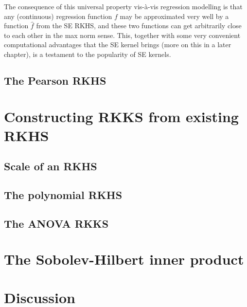 \documentclass[a4paper,showframe,11pt,draft]{report}
\begin{document}
The consequence of this universal property vis-à-vis regression modelling is that any (continuous) regression function $f$ may be approximated very well by a function $\hat f$ from the SE RKHS, and these two functions can get arbitrarily close to each other in the max norm sense.
This, together with some very convenient computational advantages that the SE kernel brings (more on this in a later chapter), is a testament to the popularity of SE kernels.

\subsection{The Pearson RKHS}

\section{Constructing RKKS from existing RKHS}

\subsection{Scale of an RKHS}

\subsection{The polynomial RKHS}

\subsection{The ANOVA RKKS}


\section{The Sobolev-Hilbert inner product}

\section{Discussion}





%

%
%
%
%
%
%
%


\hClosingStuffStandalone
\end{document}
